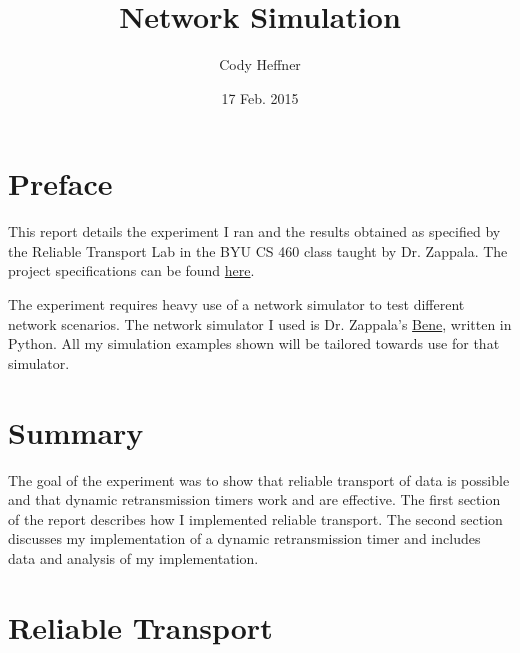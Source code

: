 \documentclass[11pt]{article}
\begin{document}
\lstset{
  language=Python,
  basicstyle=\small,          %
  keywordstyle=\bfseries,
  identifierstyle=,           %
  commentstyle=,              %
  stringstyle=\ttfamily,      %
  showstringspaces=false,     %
  numbers=left,
  numberstyle=\tiny,
  numbersep=5pt,
  frame=tb,
}

\newenvironment{absolutelynopagebreak}
  {\par\nobreak\vfil\penalty0\vfilneg
   \vtop\bgroup}
  {\par\xdef\tpd{\the\prevdepth}\egroup
   \prevdepth=\tpd}

\title{Network Simulation}

\author{Cody Heffner}

\date{17 Feb. 2015}

\maketitle

\section{Preface}

This report details the experiment I ran and the results obtained as specified by the Reliable Transport Lab in the BYU CS 460 class taught by Dr. Zappala. The project specifications can be found \href{http://cs460.byu.edu/winter-2015/labs/reliable-transport}{here}.

The experiment requires heavy use of a network simulator to test different network scenarios. The network simulator I used is Dr. Zappala's \href{https://github.com/zappala/bene}{Bene}, written in Python. All my simulation examples shown will be tailored towards use for that simulator.

\section{Summary}

The goal of the experiment was to show that reliable transport of data is possible and that dynamic retransmission timers work and are effective. The first section of the report describes how I implemented reliable transport. The second section discusses my implementation of a dynamic retransmission timer and includes data and analysis of my implementation.

\section{Reliable Transport}
\end{document}
